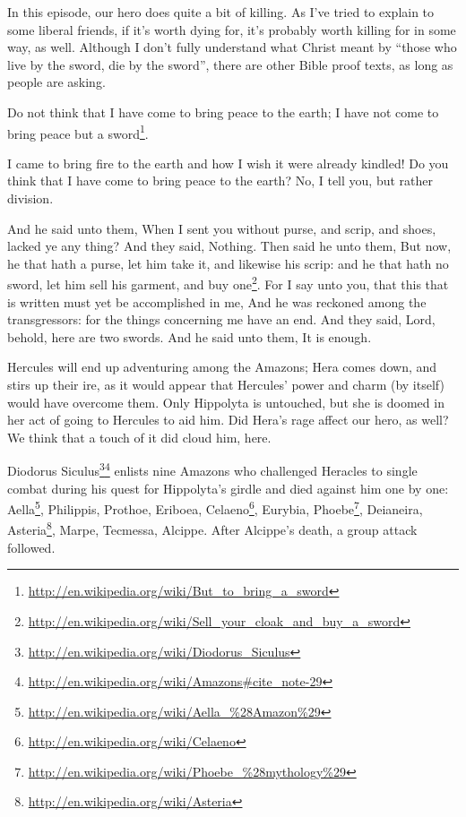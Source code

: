 In this episode, our hero does quite a bit of killing. As I've tried to explain to some liberal friends, if it's worth dying for, it's probably worth killing for in some way, as well. Although I don't fully understand what Christ meant by ``those who live by the sword, die by the sword'', there are other Bible proof texts, as long as people are asking.

\begin{quotex}
Do not think that I have come to bring peace to the earth; I have not come to bring peace but a sword\footnote{\url{http://en.wikipedia.org/wiki/But\_to\_bring\_a\_sword}}.

I came to bring fire to the earth and how I wish it were already kindled! Do you think that I have come to bring peace to the earth? No, I tell you, but rather division.

And he said unto them, When I sent you without purse, and scrip, and shoes, lacked ye any thing? And they said, Nothing. Then said he unto them, But now, he that hath a purse, let him take it, and likewise his scrip: and he that hath no sword, let him sell his garment, and buy one\footnote{\url{http://en.wikipedia.org/wiki/Sell\_your\_cloak\_and\_buy\_a\_sword}}. For I say unto you, that this that is written must yet be accomplished in me, And he was reckoned among the transgressors: for the things concerning me have an end. And they said, Lord, behold, here are two swords. And he said unto them, It is enough.
\end{quotex}


Hercules will end up adventuring among the Amazons; Hera comes down, and stirs up their ire, as it would appear that Hercules' power and charm (by itself) would have overcome them. Only Hippolyta is untouched, but she is doomed in her act of going to Hercules to aid him. Did Hera's rage affect our hero, as well? We think that a touch of it did cloud him, here.

\begin{quotex}
Diodorus Siculus\footnote{\url{http://en.wikipedia.org/wiki/Diodorus\_Siculus}}\footnote{\url{http://en.wikipedia.org/wiki/Amazons\#cite\_note-29}} enlists nine Amazons who challenged Heracles to single combat during his quest for Hippolyta's girdle and died against him one by one: Aella\footnote{\url{http://en.wikipedia.org/wiki/Aella\_\%28Amazon\%29}}, Philippis, Prothoe, Eriboea, Celaeno\footnote{\url{http://en.wikipedia.org/wiki/Celaeno}}, Eurybia, Phoebe\footnote{\url{http://en.wikipedia.org/wiki/Phoebe\_\%28mythology\%29}}, Deianeira, Asteria\footnote{\url{http://en.wikipedia.org/wiki/Asteria}}, Marpe, Tecmessa, Alcippe. After Alcippe's death, a group attack followed.
\end{quotex}


